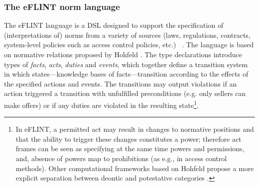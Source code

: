 \subsubsection{The eFLINT norm language}
\label{sec:back:eflint}
%
The eFLINT language is a DSL designed to support the specification of (interpretations of) norms from a variety of sources (laws, regulations, contracts, system-level policies such as access control policies, etc.) ~\cite{VanBinsbergen2020EFLINT:Specifications,binsbergen2021b}.
%
The language is based on normative relations proposed by Hohfeld \cite{hohfeld1917fundamental}. 
The type declarations introduce types of \textit{facts}, \textit{acts}, \textit{duties} and \textit{events}, which together define a transition system in which states---knowledge bases of facts---transition according to the effects of the specified actions and events.
%
The transitions may output violations if an action triggered a transition with unfulfilled preconditions (e.g. only sellers can make offers) or if any duties are violated in the resulting state\footnote{In eFLINT, a permitted act may result in changes to normative positions and that the ability to trigger these changes constitutes a power; therefore act frames can be seen as specifying at the same time powers and permissions, and, absence of powers map to prohibitions (as e.g., in access control methods). Other computational frameworks based on Hohfeld propose a more explicit separation between deontic and potestative categories \cite{Sileno2022}. 
}.



